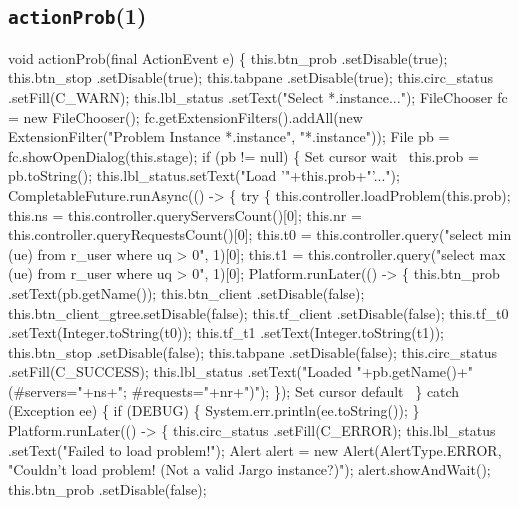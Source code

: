 \subsection{\texttt{actionProb}(1)}
\nwenddocs{}\endmoddef{}
void actionProb(final ActionEvent e) \{
  this.btn_prob     .setDisable(true);
  this.btn_stop     .setDisable(true);
  this.tabpane      .setDisable(true);
  this.circ_status  .setFill(C_WARN);
  this.lbl_status   .setText("Select *.instance...");
  FileChooser fc = new FileChooser();
  fc.getExtensionFilters().addAll(new ExtensionFilter("Problem Instance *.instance", "*.instance"));
  File pb = fc.showOpenDialog(this.stage);
  if (pb != null) \{
    \LA{}Set cursor wait~{\nwtagstyle{}}\RA{}
    this.prob = pb.toString();
    this.lbl_status.setText("Load '"+this.prob+"'...");
    CompletableFuture.runAsync(() -> \{
      try \{
        this.controller.loadProblem(this.prob);
        this.ns = this.controller.queryServersCount()[0];
        this.nr = this.controller.queryRequestsCount()[0];
        this.t0 = this.controller.query("select min (ue) from r_user where uq > 0", 1)[0];
        this.t1 = this.controller.query("select max (ue) from r_user where uq > 0", 1)[0];
        Platform.runLater(() -> \{
          this.btn_prob     .setText(pb.getName());
          this.btn_client   .setDisable(false);
          this.btn_client_gtree.setDisable(false);
          this.tf_client    .setDisable(false);
          this.tf_t0        .setText(Integer.toString(t0));
          this.tf_t1        .setText(Integer.toString(t1));
          this.btn_stop     .setDisable(false);
          this.tabpane      .setDisable(false);
          this.circ_status  .setFill(C_SUCCESS);
          this.lbl_status   .setText("Loaded "+pb.getName()+"(#servers="+ns+"; #requests="+nr+")");
        \});
        \LA{}Set cursor default~{\nwtagstyle{}}\RA{}
      \} catch (Exception ee) \{
        if (DEBUG) \{
          System.err.println(ee.toString());
        \}
        Platform.runLater(() -> \{
          this.circ_status  .setFill(C_ERROR);
          this.lbl_status   .setText("Failed to load problem!");
          Alert alert = new Alert(AlertType.ERROR, "Couldn't load problem! (Not a valid Jargo instance?)");
          alert.showAndWait();
          this.btn_prob     .setDisable(false);
